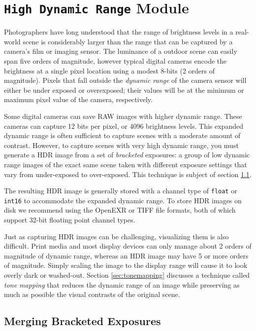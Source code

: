 \chapter{{\tt High Dynamic Range} Module}\label{ch:hdr-imaging}

Photographers have long understood that the range of brightness levels in
a real-world scene is considerably larger than the range that can be
captured by a camera's film or imaging sensor.  The luminance of a
outdoor scene can easily span five orders of magnitude, however
typical digital cameras encode the brightness at a single pixel
location using a modest 8-bits (2 orders of magnitude).  Pixels that
fall outside the {\em dynamic range} of the camera sensor will either
be under exposed or overexposed; their values will be at the minimum or
maximum pixel value of the camera, respectively.

Some digital cameras can save RAW images with higher dynamic range.
These cameras can capture 12 bits per pixel, or 4096 brightness
levels.  This expanded dynamic range is often sufficient to capture
scenes with a moderate amount of contrast. However, to capture scenes
with very high dynamic range, you must generate a HDR image from a set
of {\em bracketed} exposures: a group of low dynamic range images of
the exact same scene taken with different exposure settings that vary
from under-exposed to over-exposed.  This technique is subject of
section \ref{sec:hdr_merge}.

The resulting HDR image is generally stored with a channel type of
{\tt float} or {\tt int16} to accommodate the expanded dynamic range.
To store HDR images on disk we recommend using the OpenEXR or TIFF
file formats, both of which support 32-bit floating point channel
types.

Just as capturing HDR images can be challenging, visualizing them is
also difficult.  Print media and most display devices can only manage
about 2 orders of magnitude of dynamic range, whereas an HDR image may
have 5 or more orders of magnitude. Simply scaling the image to the
display range will cause it to look overly dark or washed-out. Section
\ref{sec:tonemapping} discusses a technique called {\em tone mapping}
that reduces the dynamic range of an image while preserving as much as
possible the visual contrasts of the original scene.

\section{Merging Bracketed Exposures}
\label{sec:hdr_merge}

